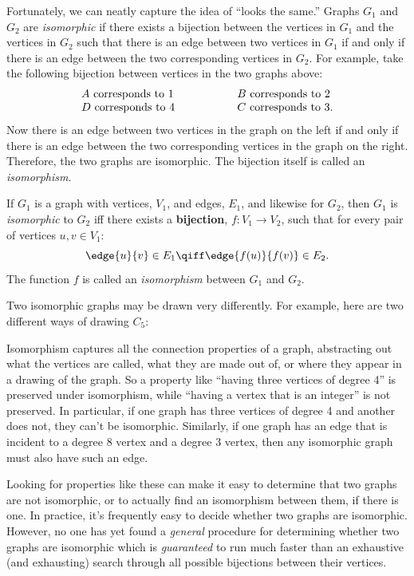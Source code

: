Fortunately, we can neatly capture the idea of ``looks the same.''  Graphs
$G_1$ and $G_2$ are {\em isomorphic} if there exists a bijection between
the vertices in $G_1$ and the vertices in $G_2$ such that there is an edge
between two vertices in $G_1$ if and only if there is an edge between the
two corresponding vertices in $G_2$.  For example, take the following
bijection between vertices in the two graphs above:
\[
\begin{array}{lll}
A \text{ corresponds to } 1 & \hspace{0.5in} & B \text{ corresponds to } 2 \\
D \text{ corresponds to } 4 & & C \text{ corresponds to } 3.
\end{array}
\]
Now there is an edge between two vertices in the graph on the left if and
only if there is an edge between the two corresponding vertices in the
graph on the right.  Therefore, the two graphs are isomorphic.  The
bijection itself is called an {\em isomorphism}.
\begin{definition}
If $G_1$ is a graph with vertices, $V_1$, and edges,
$E_1$, and likewise for $G_2$, then $G_1$ is {\em isomorphic} to $G_2$ iff
there exists a \textbf{bijection}, $f: V_1 \to V_2$, such that for
every pair of vertices $u, v \in V_1$:
\[
\edge{u}{v} \in E_1 \qiff \edge{f(u)}{f(v)} \in E_2.
\]
The function $f$ is called an {\em isomorphism} between $G_1$ and
$G_2$.
\end{definition}

Two isomorphic graphs may be drawn very differently.  For example, here
are two different ways of drawing $C_5$:


Isomorphism captures all the connection properties of a graph, abstracting
out what the vertices are called, what they are made out of, or where they
appear in a drawing of the graph.  So a property like ``having three
vertices of degree 4'' is preserved under isomorphism, while ``having a
vertex that is an integer'' is not preserved.  In particular, if one graph
has three vertices of degree 4 and another does not, they can't be
isomorphic.  Similarly, if one graph has an edge that is incident to
a degree 8 vertex and a degree 3 vertex, then any isomorphic graph must also
have such an edge.

Looking for properties like these can make it easy to determine that two
graphs are not isomorphic, or to actually find an isomorphism between
them, if there is one.  In practice, it's frequently easy to decide
whether two graphs are isomorphic.  However, no one has yet found a
\emph{general} procedure for determining whether two graphs are isomorphic
which is \emph{guaranteed} to run much faster than an exhaustive (and
exhausting) search through all possible bijections between their
vertices.

